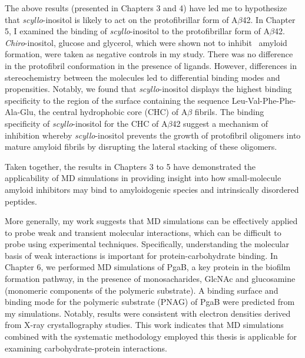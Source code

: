 The above results (presented in Chapters 3 and 4) have led me to hypothesize that \textit{scyllo}-inositol is likely to act on the protofibrillar form of A$\beta$42.  In Chapter 5, I examined the binding of \textit{scyllo}-inositol to the protofibrillar form of A$\beta$42. \textit{Chiro}-inositol, glucose and glycerol, which were shown not to inhibit \ amyloid formation, were taken as negative controls in my study. There was no difference in the protofibril conformation in the presence of ligands. However, differences in stereochemistry between the molecules led to differential binding modes and propensities. Notably, we found that \textit{scyllo}-inositol displays the highest binding specificity to the region of the surface containing the sequence Leu-Val-Phe-Phe-Ala-Glu, the central hydrophobic core (CHC) of A$\beta$ fibrils.  The binding specificity of \textit{scyllo}-inositol for the CHC of A$\beta$42 suggest a mechanism of inhibition whereby \textit{scyllo}-inositol prevents the growth of protofibril oligomers into mature amyloid fibrils by disrupting the lateral stacking of these oligomers.

Taken together, the results in Chapters 3 to 5 have demonstrated the applicability of MD simulations in providing insight into how small-molecule amyloid inhibitors may bind to amyloidogenic species and intrinsically disordered peptides. 

More generally, my work suggests that MD simulations can be effectively applied to probe weak and transient molecular interactions, which can be difficult to probe using experimental techniques. Specifically, understanding the molecular basis of weak interactions is important for protein-carbohydrate binding.\cite{Canchi:2011cg,Fadda:2010p5889}
In Chapter 6, we performed MD simulations of PgaB, a key protein in the biofilm formation pathway, in the presence of monosacharides, GlcNAc and glucosamine (monomeric components of the polymeric substrate). A binding surface and binding mode for the polymeric substrate (PNAG) of PgaB were predicted from my simulations. Notably, results were consistent with electron densities derived from X-ray crystallography studies. This work indicates that MD simulations combined with the systematic methodology employed this thesis is applicable for examining carbohydrate-protein interactions.

